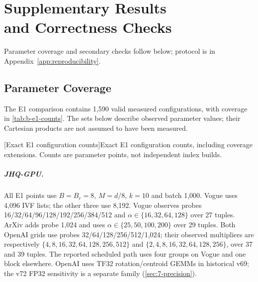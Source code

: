 \chapter[Supplementary Results and Correctness Checks]{Supplementary Results\\and Correctness Checks}
\label{app:supplementary}
Parameter coverage and secondary checks follow below; protocol is in Appendix~\ref{app:reproducibility}.

\section{Parameter Coverage}
\label{sec:b-grids}
The E1 comparison contains 1,590 valid measured configurations, with
coverage in \cref{tab:b-e1-counts}. The sets below describe observed parameter values;
their Cartesian products are not assumed to have been measured.

\par\medskip\noindent\begin{minipage}{\linewidth}
\centering\captionsetup{hypcap=false}
[Exact E1 configuration counts]{Exact E1 configuration counts, including coverage
extensions. Counts are parameter points, not independent index builds.}
\label{tab:b-e1-counts}
\footnotesize\setlength{\tabcolsep}{4pt}

\end{minipage}\par\medskip

\begingroup\raggedright
\paragraph{JHQ-GPU.}
All E1 points use $B=B_r=8$, $M=d/8$, $k=10$ and batch 1,000.
Vogue uses 4,096 IVF lists; the other three use 8,192.
Vogue observes probes 16/\allowbreak{}32/\allowbreak{}64/\allowbreak{}96/\allowbreak{}128/\allowbreak{}192/\allowbreak{}256/\allowbreak{}384/\allowbreak{}512 and
$\alpha\in\{16,32,64,128\}$ over 27 tuples. ArXiv adds probe 1,024
and uses $\alpha\in\{25,50,100,200\}$ over 29 tuples.
Both OpenAI grids use probes 32/\allowbreak{}64/\allowbreak{}128/\allowbreak{}256/\allowbreak{}512/\allowbreak{}1,024;
their observed multipliers are respectively
$\{4,8,16,32,64,128,256,512\}$ and
$\{2,4,8,16,32,64,128,256\}$, over 37 and 39 tuples.
The reported scheduled path uses four groups on Vogue and one block
elsewhere. OpenAI uses TF32 rotation/centroid GEMMs in historical v69;
the v72 FP32 sensitivity is a separate family (\cref{sec:7-precision}).

